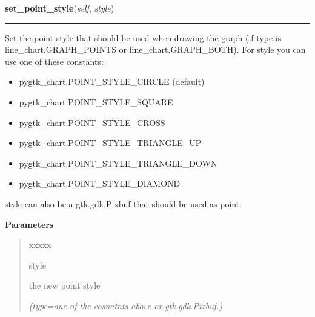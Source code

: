 \hspace{.8\funcindent}\begin{boxedminipage}{\funcwidth}

    \raggedright \textbf{set\_point\_style}(\textit{self}, \textit{style})

    \vspace{-1.5ex}

    \rule{\textwidth}{0.5\fboxrule}
\setlength{\parskip}{2ex}
    Set the point style that should be used when drawing the graph (if type
    is line\_chart.GRAPH\_POINTS or line\_chart.GRAPH\_BOTH). For style you
    can use one of these constants:

    \begin{itemize}
    \setlength{\parskip}{0.6ex}
      \item pygtk\_chart.POINT\_STYLE\_CIRCLE (default)

      \item pygtk\_chart.POINT\_STYLE\_SQUARE

      \item pygtk\_chart.POINT\_STYLE\_CROSS

      \item pygtk\_chart.POINT\_STYLE\_TRIANGLE\_UP

      \item pygtk\_chart.POINT\_STYLE\_TRIANGLE\_DOWN

      \item pygtk\_chart.POINT\_STYLE\_DIAMOND

    \end{itemize}

    style can also be a gtk.gdk.Pixbuf that should be used as point.

\setlength{\parskip}{1ex}
      \textbf{Parameters}
      \vspace{-1ex}

      \begin{quote}
        \begin{Ventry}{xxxxx}

          \item[style]

          the new point style

            {\it (type=one of the cosnatnts above or gtk.gdk.Pixbuf.)}

        \end{Ventry}

      \end{quote}

    \end{boxedminipage}

